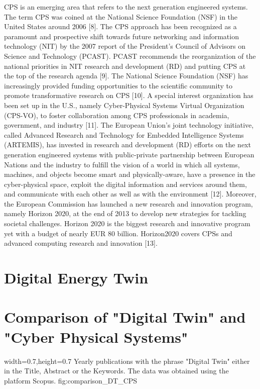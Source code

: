 CPS is an emerging area that refers to the next generation engineered systems. The term CPS was
coined at the National Science Foundation (NSF) in the United States around 2006 [8]. The CPS
approach has been recognized as a paramount and prospective shift towards future networking and
information technology (NIT) by the 2007 report of the President’s Council of Advisors on
Science and Technology (PCAST). PCAST recommends the reorganization of the national
priorities in NIT research and development (RD) and putting CPS at the top of the research
agenda [9]. The National Science Foundation (NSF) has increasingly provided funding opportunities to the scientific community to promote transformative research on CPS [10]. A
special interest organization has been set up in the U.S., namely Cyber-Physical Systems Virtual
Organization (CPS-VO), to foster collaboration among CPS professionals in academia,
government, and industry [11]. The European Union’s joint technology initiative, called
Advanced Research and Technology for Embedded Intelligence Systems (ARTEMIS), has
invested in research and development (RD) efforts on the next generation engineered systems
with public-private partnership between European Nations and the industry to fulfill the vision of
a world in which all systems, machines, and objects become smart and physically-aware, have a
presence in the cyber-physical space, exploit the digital information and services around them, and
communicate with each other as well as with the environment [12]. Moreover, the European
Commission has launched a new research and innovation program, namely Horizon 2020, at the
end of 2013 to develop new strategies for tackling societal challenges. Horizon 2020 is the biggest
research and innovative program yet with a budget of nearly EUR 80 billion. Horizon2020 covers
CPSs and advanced computing research and innovation [13].

\cite{gunes2014survey}

\section{Digital Energy Twin}
\section{Comparison of "Digital Twin" and "Cyber Physical Systems"}

\cite{tao2019digital}

  {width=0.7\textwidth,height=0.7\textheight}%
  {Yearly publications with the phrase "Digital Twin" either in the Title, Abstract or the Keywords. The data was obtained using the platform Scopus. }%
  {}%
  {fig:comparison_DT_CPS}%
  
